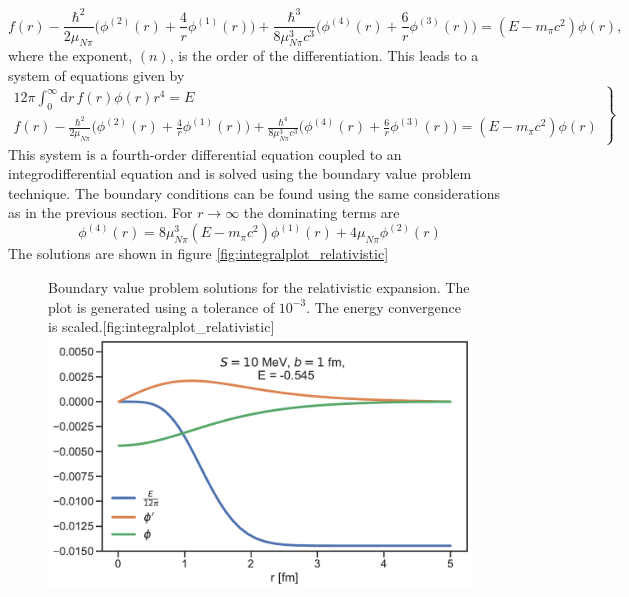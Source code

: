 \begin{equation}
	f(r)-\frac{\hbar^2}{2\mu_{N\pi}}\bigg( \phi^{(2)}(r)+\frac{4}{r}\phi^{(1)}(r) \bigg)+\frac{\hbar^3}{8\mu_{N\pi}^3 c^3}\bigg(\phi^{(4)}(r)+\frac{6}{r}\phi^{(3)}(r)\bigg)=(E-m_\pi c^2)\phi(r),
\end{equation}
where the exponent, $(n)$, is the order of the differentiation. This leads to a system of equations given by
\begin{equation} \label{systemrel}
	\left.
	\begin{array}{ll}
		12\pi \int_0^\infty  \text{d}r \, f(r) \phi(r) r^4  = E \\
		f(r)-\frac{\hbar^2}{2\mu_{N\pi}}\big( \phi^{(2)}(r)+\frac{4}{r}\phi^{(1)}(r) \big)+\frac{\hbar^4}{8\mu_{N\pi}^3 c^3}\big(\phi^{(4)}(r)+\frac{6}{r}\phi^{(3)}(r)\big)=(E-m_\pi c^2)\phi(r)
	\end{array}
	\right \} 
\end{equation}
This system is a fourth-order differential equation coupled to an integrodifferential equation and is solved using the boundary value problem technique. The boundary conditions can be found using the same considerations as in the previous section. For $r\rightarrow \infty$ the dominating terms are 
\begin{equation}
	\phi^{(4)}(r) = 8\mu_{N\pi}^3(E-m_\pi c^2) \phi^{(1)}(r)+4\mu_{N\pi} \phi^{(2)}(r)
\end{equation}
The solutions are shown in figure \ref{fig:integralplot_relativistic}
\begin{figure}[H]
	\begin{sidecaption}{Boundary value problem solutions for the relativistic expansion. The plot is generated using a tolerance of $10^{-3}$. The energy convergence is scaled.}[fig:integralplot_relativistic]
		\includegraphics[width=\linewidth]{Figures/Integralplot_relativistic.pdf}
	\end{sidecaption}
\end{figure}
